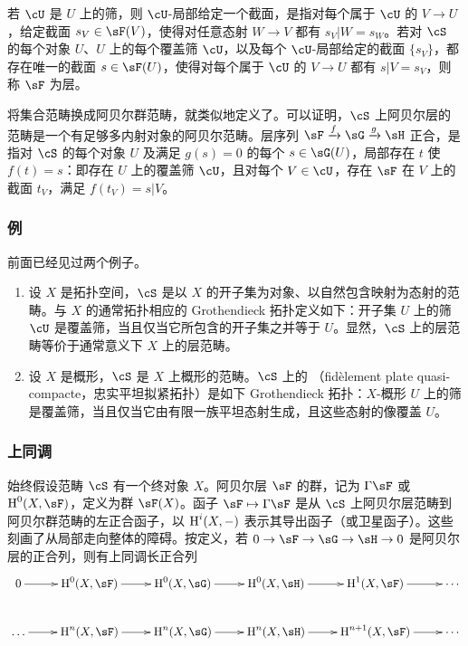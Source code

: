 若 $\cU$ 是 $U$ 上的筛，则 $\cU$-局部给定一个截面，是指对每个属于 $\cU$ 的 $V\to U$，给定截面 $s_V\in\sF(V)$，使得对任意态射 $W\to V$ 都有 $s_V|W=s_W$。若对 $\cS$ 的每个对象 $U$、$U$ 上的每个覆盖筛 $\cU$，以及每个 $\cU$-局部给定的截面 $\{s_V\}$，都存在唯一的截面 $s\in\sF(U)$，使得对每个属于 $\cU$ 的 $V\to U$ 都有 $s|V=s_V$，则称 $\sF$ 为层。

将集合范畴换成阿贝尔群范畴，就类似地定义了。可以证明，$\cS$ 上阿贝尔层的范畴是一个有足够多内射对象的阿贝尔范畴。层序列 $\sF\xrightarrow f\sG\xrightarrow g\sH$ 正合，是指对 $\cS$ 的每个对象 $U$ 及满足 $g(s)=0$ 的每个 $s\in\sG(U)$，局部存在 $t$ 使 $f(t)=s$：即存在 $U$ 上的覆盖筛 $\cU$，且对每个 $V\in\cU$，存在 $\sF$ 在 $V$ 上的截面 $t_V$，满足 $f(t_V)=s|V$。

\subsubsection{例}\label{I:1-6-4}
前面已经见过两个例子。
\begin{enumerate}[\indent a)]
\item 设 $X$ 是拓扑空间，$\cS$ 是以 $X$ 的开子集为对象、以自然包含映射为态射的范畴。与 $X$ 的通常拓扑相应的 Grothendieck 拓扑定义如下：开子集 $U$ 上的筛 $\cU$ 是覆盖筛，当且仅当它所包含的开子集之并等于 $U$。显然，$\cS$ 上的层范畴等价于通常意义下 $X$ 上的层范畴。
\item 设 $X$ 是概形，$\cS$ 是 $X$ 上概形的范畴。$\cS$ 上的 （fidèlement plate quasi-compacte，忠实平坦拟紧拓扑）是如下 Grothendieck 拓扑：$X$-概形 $U$ 上的筛是覆盖筛，当且仅当它由有限一族平坦态射生成，且这些态射的像覆盖 $U$。
\end{enumerate}

\subsubsection{上同调}\label{I:1-6-5}
始终假设范畴 $\cS$ 有一个终对象 $X$。阿贝尔层 $\sF$ 的群，记为 $\Gamma\sF$ 或 $\h^0(X,\sF)$，定义为群 $\sF(X)$。函子 $\sF\mapsto\Gamma\sF$ 是从 $\cS$ 上阿贝尔层范畴到阿贝尔群范畴的左正合函子，以 $\operatorname{H}^i(X,-)$ 表示其导出函子（或卫星函子）。这些刻画了从局部走向整体的障碍。按定义，若 $0\to\sF\to\sG\to\sH\to0$ 是阿贝尔层的正合列，则有上同调长正合列
\[\xymatrix{
 0\ar[r]&\h^0(X,\sF)\ar[r]&\h^0(X,\sG)\ar[r]&\h^0(X,\sH)\ar[r]&\h^1(X,\sF)\ar[r]&\cdots\\
 \ldots\ar[r]&\h^n(X,\sF)\ar[r]&\h^n(X,\sG)\ar[r]&\h^n(X,\sH)\ar[r]&\h^{n+1}(X,\sF)\ar[r]&\cdots
}\]


